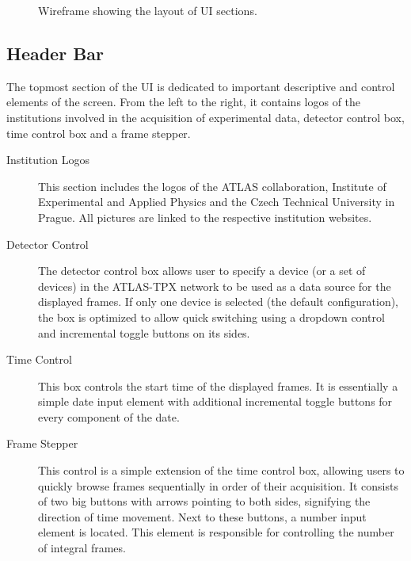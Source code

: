 \begin{figure}[t]
\begin{center}

\caption{Wireframe showing the layout of UI sections.}
\label{fig:wireframe}
\end{center}
\end{figure}

\subsection{Header Bar}
The topmost section of the UI is dedicated to important descriptive and control elements of the screen. From the left to the right, it contains logos of the institutions involved in the acquisition of experimental data, detector control box, time control box and a frame stepper.

\begin{description}
	\item[Institution Logos]
	This section includes the logos of the ATLAS collaboration, Institute of Experimental and Applied Physics and the Czech Technical University in Prague. All pictures are linked to the respective institution websites.

	\item[Detector Control]
	The detector control box allows user to specify a device (or a set of devices) in the ATLAS-TPX network to be used as a data source for the displayed frames. If only one device is selected (the default configuration), the box is optimized to allow quick switching using a dropdown control and incremental toggle buttons on its sides.

	\item[Time Control]
	This box controls the start time of the displayed frames. It is essentially a simple date input element with additional incremental toggle buttons for every component of the date.

	\item[Frame Stepper]
	This control is a simple extension of the time control box, allowing users to quickly browse frames sequentially in order of their acquisition. It consists of two big buttons with arrows pointing to both sides, signifying the direction of time movement. Next to these buttons, a number input element is located. This element is responsible for controlling the number of integral frames.
\end{description}

